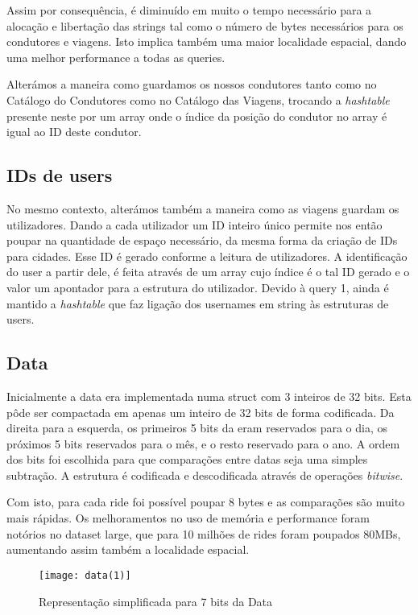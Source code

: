 \documentclass{article}
\begin{document}
            Assim por consequência, é diminuído em muito o tempo necessário para a alocação e libertação
            das strings tal como o número de bytes necessários para os condutores e viagens.
            Isto implica também uma maior localidade espacial, dando uma melhor performance
            a todas as queries.
            
            Alterámos a maneira como guardamos os nossos condutores tanto 
            como no Catálogo do Condutores como no Catálogo das Viagens, trocando a 
            \textit{hashtable} presente neste por um array onde o índice da posição do condutor 
            no array é igual ao ID deste condutor. 
        \subsection{IDs de users}
            No mesmo contexto, alterámos também a maneira como as viagens guardam os utilizadores. 
            Dando a cada utilizador um ID inteiro único permite nos então poupar na quantidade de espaço necessário,
            da mesma forma da criação de IDs para cidades.
            Esse ID é gerado conforme a leitura de utilizadores. 
            A identificação do user a partir dele, é feita através de um array cujo índice é o tal ID gerado
            e o valor um apontador para a estrutura do utilizador.
            Devido à query 1, ainda é mantido a \textit{hashtable} que faz ligação dos usernames em string às estruturas de users.
        \newpage
        \subsection{Data}
            Inicialmente a data era implementada numa struct com 3 inteiros de 32 bits.
            Esta pôde ser compactada em apenas um inteiro de 32 bits de forma codificada.
            Da direita para a esquerda, os primeiros 5 bits da eram reservados para o dia, os próximos 5 bits
            reservados para o mês, e o resto reservado para o ano. A ordem dos bits
            foi escolhida para que comparações entre datas seja uma simples subtração.
            A estrutura é codificada e descodificada através de operações \textit{bitwise}.
            
            Com isto, para cada ride foi possível poupar 8 bytes e as comparações são
            muito mais rápidas. Os melhoramentos no uso de memória e performance foram
            notórios no dataset large, que para 10 milhões de rides foram poupados 80MBs,
            aumentando assim também a localidade espacial.
            \begin{figure}[h]
                \centering
                \texttt{[image: data(1)]}
                \caption{Representação simplificada para 7 bits da Data}
            \end{figure}
\end{document}
